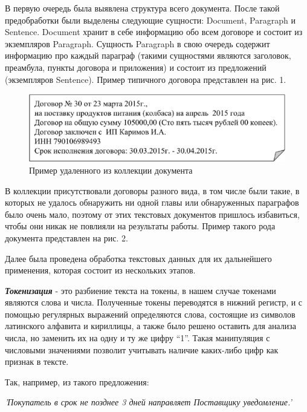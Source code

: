 \documentclass[12pt]{article}
\newcounter{c_tab}
\begin{document}
В первую очередь была выявлена структура всего документа. После такой предобработки были выделены следующие сущности: Document, Paragraph и Sentence. Document хранит в себе информацию обо всем договоре и состоит из экземпляров Paragraph. Сущность Paragraph в свою очередь содержит информацию про каждый параграф (такими сущностями являются заголовок, преамбула, пункты договора и приложения) и состоит из предложений (экземпляров Sentence). Пример типичного договора представлен на рис. 1. 

\vspace{5pt}
\begin{figure}[h!]
	\includegraphics[scale=0.74]{images/im2.eps}
	\caption{Пример удаленного из коллекции документа}
	\label{im2}
\end{figure}
\vspace{5pt}

В коллекции присутствовали договоры разного вида, в том числе были такие, в которых не удалось обнаружить ни одной главы или обнаруженных параграфов было очень мало, поэтому от этих текстовых документов пришлось избавиться, чтобы они никак не повлияли \linebreak на результаты работы. Пример такого рода документа представлен на рис. 2.

Далее была проведена обработка текстовых данных для их дальнейшего применения, которая состоит из нескольких этапов.

\vspace{5pt}
\textbf{\textit{Токенизация}} - это разбиение текста на токены, в нашем случае токенами являются слова и числа. Полученные токены переводятся в нижний регистр, и с помощью регулярных выражений определяются  слова, состоящие из символов латинского алфавита и кириллицы,  а также было решено оставить для анализа числа, но заменить их на одну и ту же цифру “1”. Такая манипуляция с числовыми значениями позволит учитывать наличие каких-либо цифр как признак в тексте. 

Так, например, из такого предложения:

\vspace{13pt}
\noindent\textit{'Покупатель в срок не позднее 3 дней направляет Поставщику уведомление.'}
\end{document}
